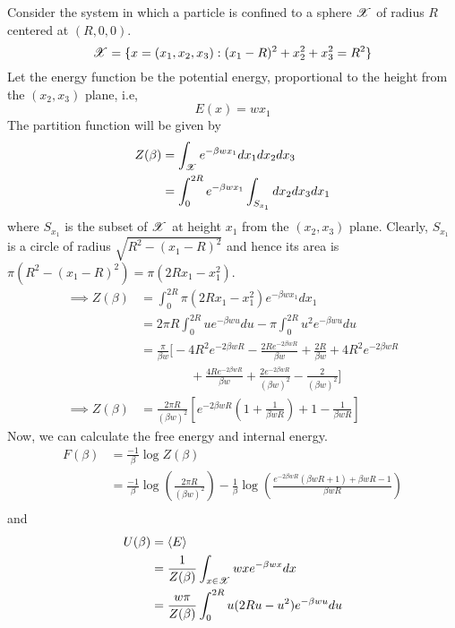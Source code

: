 \documentclass[letterpaper,english,12pt]{article}
\begin{document}
\begin{exmp}[Sphere]
Consider the system in which a particle is confined to a sphere $\mathscr{X}$ of radius $R$ centered at $(R,0,0)$.
$$\mathscr{X} = \{ x = (x_1, x_2, x_3) : (x_1 - R)^2 + x_2^2 + x_3^2 = R^2 \}$$
Let the energy function be the potential energy, proportional to the height from the $(x_2, x_3)$ plane, i.e,
$$ E(x) = w x_1$$
The partition function will be given by
\begin{align}
Z(\beta) &= \int_{\mathscr{X}} e^{-\beta w x_1} dx_1 dx_2 dx_3 \nonumber \\
	&= \int_0^{2R} e^{-\beta w x_1} \int_{S_{x_1}} dx_2 dx_3 dx_1\nonumber
\end{align}
where $S_{x_1}$ is the subset of $\mathscr{X}$ at height $x_1$ from the $(x_2, x_3)$ plane. Clearly, $S_{x_1}$ is a circle of radius $\sqrt{R^2 - (x_1-R)^2}$ and hence its area is $ \pi (R^2 - (x_1-R)^2) = \pi(2Rx_1 - x_1^2)$.
\begin{align}
\implies Z(\beta) &= \int_0^{2R} \pi (2Rx_1 - x_1^2) e^{-\beta w x_1} dx_1 \nonumber \\
	&= 2 \pi R \int_0^{2R} u e^{-\beta wu} du - \pi \int_0^{2R} u^2 e^{-\beta wu} du \nonumber \\
	&= \frac{\pi}{\beta w} \bigg[ -4R^2 e^{-2 \beta wR} - \frac{2R e^{-2 \beta wR}}{\beta w} + \frac{2R}{\beta w} 
	+ 4R^2 e^{-2 \beta wR} \nonumber \\ 
	& \qquad \qquad + \frac{4R e^{-2 \beta wR}}{\beta w} + \frac{2e^{-2 \beta wR}}{(\beta w)^2} - \frac{2}{(\beta w)^2} 
	\bigg] \nonumber \\
\implies Z(\beta) &= \frac{2\pi R}{(\beta w)^2} \left[ e^{-2 \beta wR} \left( 1 + \frac{1}{\beta w R} \right) + 1 - \frac{1}{\beta wR} \right] \label{eq:6}
\end{align}
Now, we can calculate the free energy and internal energy.
\begin{align}
F(\beta) &= \frac{-1}{\beta} \log Z(\beta) \nonumber \\
	&= \frac{-1}{\beta} \log \left( \frac{2 \pi R}{(\beta w)^2} \right) - \frac{1}{\beta} \log \left( \frac{e^{-2 \beta wR}(\beta wR + 1) + \beta wR - 1}{\beta wR} \right) \nonumber \\
\end{align}
and
\begin{align}
U(\beta) &= \left\langle E \right\rangle \nonumber \\
	&= \frac{1}{Z(\beta)} \int_{x \in \sX} wx e^{- \beta wx} dx \nonumber \\
	&= \frac{w \pi}{Z(\beta)} \int_0^{2R} u(2Ru - u^2) e^{-\beta wu} du \nonumber \\

\end{align}
\end{exmp}
\end{document}
